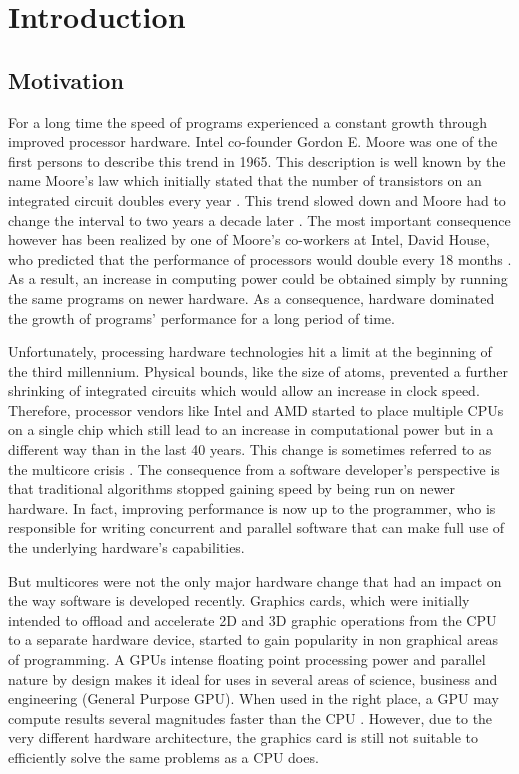 \chapter{Introduction}

\section{Motivation}

For a long time the speed of programs experienced a constant growth through improved processor hardware. Intel co-founder Gordon E. Moore was one of the first persons to describe this trend in 1965. This description is well known by the name Moore's law which initially stated that the number of transistors on an integrated circuit doubles every year \cite{moore_law}. This trend slowed down and Moore had to change the interval to two years a decade later \cite{moore_law_2003}. The most important consequence however has been realized by one of Moore's co-workers at Intel, David House, who predicted that the performance of processors would double every 18 months \cite{moore_law_2003}. As a result, an increase in computing power could be obtained simply by running the same programs on newer hardware. As a consequence, hardware dominated the growth of programs' performance for a long period of time.

Unfortunately, processing hardware technologies hit a limit at the beginning of the third millennium. Physical bounds, like the size of atoms, prevented a further shrinking of integrated circuits which would allow an increase in clock speed. Therefore, processor vendors like Intel and AMD started to place multiple CPUs on a single chip which still lead to an increase in computational power but in a different way than in the last 40 years. This change is sometimes referred to as the multicore crisis \cite{multicore_crisis}. The consequence from a software developer's perspective is that traditional algorithms stopped gaining speed by being run on newer hardware. In fact, improving performance is now up to the programmer, who is responsible for writing concurrent and parallel software that can make full use of the underlying hardware's capabilities. 

But multicores were not the only major hardware change that had an impact on the way software is developed recently. Graphics cards, which were initially intended to offload and accelerate 2D and 3D graphic operations from the CPU to a separate hardware device, started to gain popularity in non graphical areas of programming. A GPUs intense floating point processing power and parallel nature by design makes it ideal for uses in several areas of science, business and engineering (General Purpose GPU). When used in the right place, a GPU may compute results several magnitudes faster than the CPU \cite{gpu_history}. However, due to the very different hardware architecture, the graphics card is still not suitable to efficiently solve the same problems as a CPU does.

